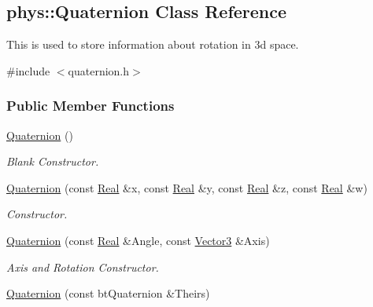\hypertarget{classphys_1_1Quaternion}{
\subsection{phys::Quaternion Class Reference}
\label{df/d8c/classphys_1_1Quaternion}
}


This is used to store information about rotation in 3d space.  




{\ttfamily \#include $<$quaternion.h$>$}

\subsubsection*{Public Member Functions}
\begin{DoxyCompactItemize}
\item 
\hyperlink{classphys_1_1Quaternion_aca4ee6fd6d3967f06cc4a32361fa5a62}{Quaternion} ()
\begin{DoxyCompactList}\small\item\em Blank Constructor. \item\end{DoxyCompactList}\item 
\hyperlink{classphys_1_1Quaternion_ac8037875c08ce10c0195f3e6fd08b172}{Quaternion} (const \hyperlink{namespacephys_af7eb897198d265b8e868f45240230d5f}{Real} \&x, const \hyperlink{namespacephys_af7eb897198d265b8e868f45240230d5f}{Real} \&y, const \hyperlink{namespacephys_af7eb897198d265b8e868f45240230d5f}{Real} \&z, const \hyperlink{namespacephys_af7eb897198d265b8e868f45240230d5f}{Real} \&w)
\begin{DoxyCompactList}\small\item\em Constructor. \item\end{DoxyCompactList}\item 
\hyperlink{classphys_1_1Quaternion_a9246247b7b28f19839148415a7ddeb96}{Quaternion} (const \hyperlink{namespacephys_af7eb897198d265b8e868f45240230d5f}{Real} \&Angle, const \hyperlink{classphys_1_1Vector3}{Vector3} \&Axis)
\begin{DoxyCompactList}\small\item\em Axis and Rotation Constructor. \item\end{DoxyCompactList}\item 
\hyperlink{classphys_1_1Quaternion_ab9f13d19fe7d602d7c5feaed0aaf4620}{Quaternion} (const btQuaternion \&Theirs)

\end{DoxyCompactItemize}
